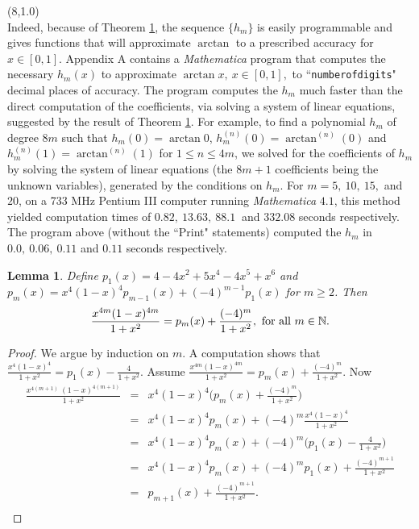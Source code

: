 \documentclass[a0]{a0poster}
\newtheorem{lemma}{Lemma}
\theoremstyle{definition}
\def\LHead#1{\noindent{\bf \LARGE\color{DarkBlue} #1}\smallskip}
\begin{document}
\begin{textblock}{7}(8,1.0)
\LHead{Results}\\
Indeed, because of Theorem \ref{basicrecursion}, the sequence $\{h_m\}$ is easily programmable
and gives functions that will approximate $\arctan$ to a prescribed
accuracy for $x\in [0,1]$. Appendix A contains a {\sl Mathematica} program
that computes the necessary $h_m(x)$ to approximate $\arctan x,\ x\in[0,1],$ to
``{\tt numberofdigits}" decimal places of accuracy.
The program computes the $h_m$ much faster than the direct
computation of the coefficients, via solving a system of linear equations,
suggested by the result of Theorem \ref{basicrecursion}. For example,
to find a polynomial $h_m$ of degree $8m$ such that $h_m(0)=\arctan 0$,
$h_m^{(n)}(0) = \arctan^{(n)}(0)$ and $h_m^{(n)}(1) = \arctan^{(n)}(1)$ for
$1\leq n \leq 4m$, we solved for the coefficients of $h_m$ by solving
the system of linear equations (the $8m+1$ coefficients being
the unknown variables),
generated by the conditions on $h_m$. For
$m=5,\ 10,\ 15,$ and $20$, on a 733 MHz Pentium III computer running
{\sl Mathematica} $4.1$,  this method yielded computation times of $0.82,\ 13.63,\ 88.1\ $ and $332.08$ seconds respectively. The program above
(without the ``Print" statements)
computed the $h_m$ in $0.0,\ 0.06,\ 0.11$ and $0.11$ seconds respectively.

\begin{lemma}\label{basicrecursion}
Define $p_1(x) = 4-4x^2+5x^4-4x^5+x^6$ and $p_m(x)
= x^4 (1-x)^4 p_{m-1}(x) + (-4)^{m-1} p_1(x)$ for $m\geq 2$. Then
$$\frac{x^{4m} (1-x)^{4m}}{1+x^2} = p_m(x) + \frac{(-4)^m}{1+x^2},
\ {\rm for\ all\ }m\in\mathbb{N}.$$
\end{lemma}

\begin{proof}
We argue by induction on $m$. A computation shows that $\frac{x^4 (1-x)^4}{1+x^2} =
p_1(x) - \frac{4}{1+x^2}$. Assume $\frac{x^{4m} (1-x)^{4m}}{1+x^2} = p_m(x) +
\frac{(-4)^m}{1+x^2}$. Now
\begin{eqnarray*}
\frac{x^{4(m+1)}\ (1-x)^{4(m+1)}}{1+x^2} &=&
x^4 (1-x)^4 \Big( p_m(x) + \frac{(-4)^m}{1+x^2} \Big)\\
&=& x^4 (1-x)^4  p_m(x) + (-4)^m \frac{x^4 (1-x)^4}{1+x^2}\\
&=& x^4 (1-x)^4  p_m(x) + (-4)^m \Big(p_1(x) - \frac{4}{1+x^2}\Big)\\
&=& x^4 (1-x)^4  p_m(x) + (-4)^m p_1(x) + \frac{(-4)^{m+1}}{1+x^2}\\
&=& p_{m+1}(x) + \frac{(-4)^{m+1}}{1+x^2}.\\
\end{eqnarray*}
\vskip-70pt
\end{proof}
\end{textblock}
\end{document}
